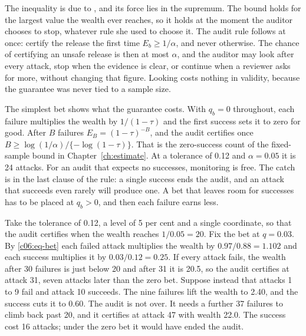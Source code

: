The inequality is due to \citet{ville1939}, and its force lies in the supremum.
The bound holds for the largest value the wealth ever reaches, so it holds at the
moment the auditor chooses to stop, whatever rule she used to choose it. The audit
rule follows at once: certify the release the first time $E_b \ge 1/\alpha$, and
never otherwise. The chance of certifying an unsafe release is then at most
$\alpha$, and the auditor may look after every attack, stop when the evidence is
clear, or continue when a reviewer asks for more, without changing that figure.
Looking costs nothing in validity, because the guarantee was never tied to a
sample size.

The simplest bet shows what the guarantee costs. With $q_b = 0$ throughout, each
failure multiplies the wealth by $1/(1-\tau)$ and the first success sets it to zero
for good. After $B$ failures $E_B = (1-\tau)^{-B}$, and the audit certifies once
$B \ge \log(1/\alpha)/\{-\log(1-\tau)\}$. That is the zero-success count of the
fixed-sample bound in Chapter~\ref{ch:estimate}. At a tolerance of 0.12 and
$\alpha = 0.05$ it is 24 attacks.
For an audit that expects no successes, monitoring is free. The catch is in the
last clause of the rule: a single success ends the audit, and an attack that
succeeds even rarely will produce one. A bet that leaves room for successes has to
be placed at $q_b > 0$, and then each failure earns less.

\begin{example}\label{c06:ex-bet}
Take the tolerance of 0.12, a level of 5 per cent and a single coordinate, so that the
audit certifies when the wealth reaches $1/0.05 = 20$. Fix the bet at $q = 0.03$. By
\eqref{c06:eq-bet} each failed attack multiplies the wealth by $0.97/0.88 = 1.102$ and
each success multiplies it by $0.03/0.12 = 0.25$. If every attack fails, the wealth after
30 failures is just below 20 and after 31 it is 20.5, so the audit certifies at attack 31,
seven attacks later than the zero bet. Suppose instead that attacks 1 to 9 fail and attack
10 succeeds. The nine failures lift the wealth to 2.40, and the success cuts it to 0.60.
The audit is not over. It needs a further 37 failures to climb back past 20, and it
certifies at attack 47 with wealth 22.0. The success cost 16 attacks; under the zero bet
it would have ended the audit.
\end{example}


